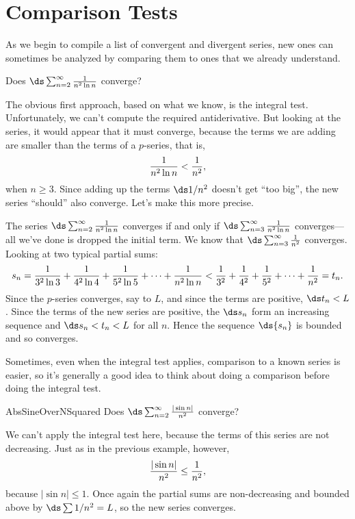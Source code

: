 \section{Comparison Tests}\label{sec:ComparisonTests}

As we begin to compile a list of convergent and divergent series, new
ones can sometimes be analyzed by comparing them to ones that we
already understand.

\begin{example}{}{}
Does $\ds\sum_{n=2}^\infty {1\over n^2\ln n}$ converge?
\end{example}
\begin{solution}
The obvious first approach, based on what we know, is the integral test.
Unfortunately, we can't compute the required antiderivative. But
looking at the series, it would appear that it must converge, because
the terms we are adding are smaller than the terms of a $p$-series,
that is,
$${1\over n^2\ln n}<{1\over n^2},$$
when $n\ge3$. Since adding up the terms $\ds 1/n^2$ doesn't get ``too
big'', the new series ``should'' also converge. Let's make this more
precise.

The series $\ds\sum_{n=2}^\infty {1\over n^2\ln n}$ converges if and
only if $\ds\sum_{n=3}^\infty {1\over n^2\ln n}$ converges---all we've
done is dropped the initial term. We know that 
$\ds\sum_{n=3}^\infty {1\over n^2}$ converges. Looking at two typical
partial sums:
$$
  s_n={1\over 3^2\ln 3}+{1\over 4^2\ln 4}+{1\over 5^2\ln 5}+\cdots+
  {1\over n^2\ln n} < {1\over 3^2}+{1\over 4^2}+
  {1\over 5^2}+\cdots+{1\over n^2}=t_n.
$$
Since the $p$-series converges, say to $L$, and since the terms are positive,
$\ds t_n<L$. Since the terms of the new series are positive, the $\ds s_n$
form an increasing sequence and $\ds s_n<t_n<L$ for all $n$. Hence the
sequence $\ds \{s_n\}$ is bounded and so converges.
\end{solution}

Sometimes, even when the integral test applies, comparison to a known
series is easier, so it's generally a good idea to think about doing a
comparison before doing the integral test.

\begin{example}{}{AbsSineOverNSquared}
Does $\ds\sum_{n=2}^\infty {|\sin n|\over n^2}$ converge?
\end{example}
\begin{solution}
We can't apply the integral test here, because the terms of this
series are not decreasing. Just as in the previous example, however,
$$ {|\sin n|\over n^2}\le {1\over n^2},$$
because $|\sin n|\le 1$. Once again the partial sums are
non-decreasing and bounded above by $\ds \sum 1/n^2=L$, so the new series
converges. 
\end{solution}

